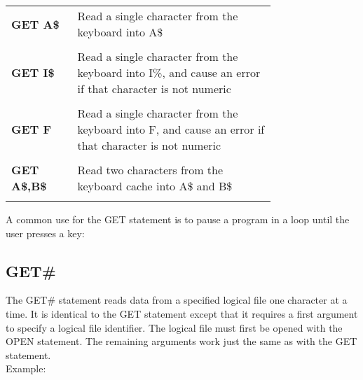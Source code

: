 \begin{tabular}{l p{0.75\linewidth}}

	{\ttfamily\bfseries GET A\$} & Read a single character from the keyboard into {\ttfamily A\$}\\\\

	{\ttfamily\bfseries GET I\$} & Read a single character from the keyboard
	into {\ttfamily I\%}, and cause an error if that character is not
	numeric\\\\

	{\ttfamily\bfseries GET F} & Read a single character from the keyboard into
	{\ttfamily F}, and cause an error if that character is not numeric\\\\

	{\ttfamily\bfseries GET A\$,B\$} & Read two characters from the keyboard
	cache into {\ttfamily A\$} and {\ttfamily B\$}\\\\

\end{tabular}

\vspace{16pt}

A common use for the {\ttfamily GET} statement is to pause a program in a loop until the user presses a key:\\


\subsection{GET\#}

The {\ttfamily GET\#} statement reads data from a specified logical file one
character at a time.  It is identical to the {\ttfamily GET} statement except
that it requires a first argument to specify a logical file identifier.  The
logical file must first be opened with the {\ttfamily OPEN} statement.  The
remaining arguments work just the same as with the {\ttfamily GET} statement.\\

Example:\\


